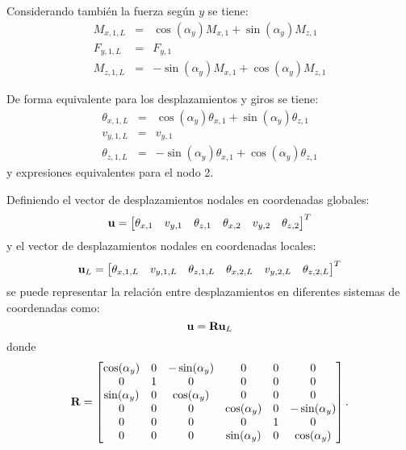 Considerando también la fuerza según $y$ se tiene:
\begin{eqnarray}
M_{x,1,L} &=& \cos(\alpha_y) M_{x,1} + \sin(\alpha_y) M_{z,1} \\
F_{y,1,L} &=& F_{y,1} \\
M_{z,1,L} &=& - \sin(\alpha_y) M_{x,1} + \cos(\alpha_y) M_{z,1}
\end{eqnarray}

De forma equivalente para los desplazamientos y giros se tiene:
\begin{eqnarray}
\theta_{x,1,L} &=& \cos(\alpha_y) \theta_{x,1} + \sin(\alpha_y) \theta_{z,1} \\
v_{y,1,L} &=& v_{y,1} \\
\theta_{z,1,L} &=& - \sin(\alpha_y) \theta_{x,1} + \cos(\alpha_y) \theta_{z,1}
\end{eqnarray}
%
y expresiones equivalentes para el nodo 2.

Definiendo el vector de desplazamientos nodales en coordenadas globales:
\begin{equation}
{\bf u} = 
\left[
\begin{matrix}
\theta_{x,1} & v_{y,1} & \theta_{z,1} & \theta_{x,2} & v_{y,2} & \theta_{z,2}
\end{matrix}
\right]^T
\end{equation}
%
y el vector de desplazamientos nodales en coordenadas locales:
\begin{equation}
{\bf u}_L = 
\left[
\begin{matrix}
\theta_{x,1,L} & v_{y,1,L} & \theta_{z,1,L} & \theta_{x,2,L} & v_{y,2,L} & \theta_{z,2,L}
\end{matrix}
\right]^T
\end{equation}
%
se puede representar la relación entre desplazamientos en diferentes sistemas de coordenadas como:
%
\begin{equation}\label{eqn:matrot}
{\bf u} = {\bf R} {\bf u}_L
\end{equation}
donde
\begin{equation}
\bfR = 
\left[
\begin{matrix}
\cos(\alpha_y) & 0  & -\sin(\alpha_y) & 0 & 0 & 0\\
 0 & 1 & 0 &  0 & 0 & 0\\
\sin(\alpha_y) & 0  & \cos(\alpha_y) & 0 & 0 & 0\\
%
0 & 0 & 0 & \cos(\alpha_y) & 0  & -\sin(\alpha_y) \\
0 & 0 & 0 & 0 & 1 & 0 \\
0 & 0 & 0 & \sin(\alpha_y) & 0  & \cos(\alpha_y)
\end{matrix}
\right].
%
\end{equation}


